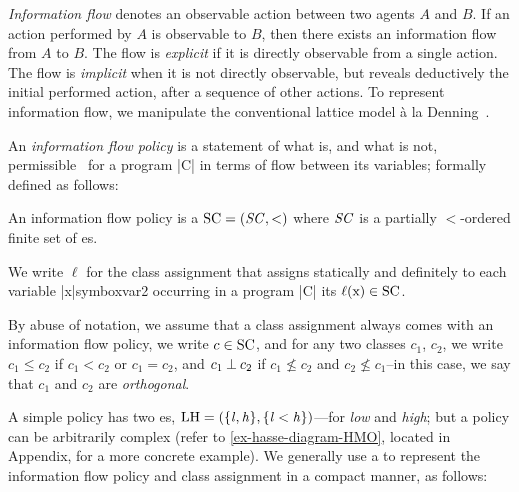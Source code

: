 \emph{Information flow} denotes an observable action
between two agents \(A\) and \(B\). If an action performed by \(A\) is
observable to \(B\), then there exists an information flow from \(A\) to \(B\).
The flow is \emph{explicit} if it is directly
observable from a single action. The flow is \emph{implicit} when it is not directly observable, but reveals deductively the
initial performed action, after a sequence of other actions. To represent
information flow, we manipulate the conventional lattice model à
la Denning~\cite{denning76}.

An \emph{information flow policy} is a statement
of what is, and what is not, permissible~\cite{bishop2003} for a program
\prc|C| in terms of flow between its variables; formally defined as
follows:

\begin{definition}\label{def:ifp} An information flow policy is a  \(\mathrm{SC} = (\mathit{SC}, <)\) where
\(\mathit{SC}\) is a partially \(<\)-ordered finite set of
es.

We write \(\ell\) for the class assignment that assigns
statically and definitely to each variable \prc|x|symbo{xvar2} occurring in a
program \prc|C| its  \(\lvl{\prc|x|} \in
\SC\). \end{definition}

By abuse of notation, we assume that a class assignment always comes with an
information flow policy, we write \(c \in
\mathrm{SC}\), and for any two classes
\(c_1\), \(c_2\), we write \(c_1 \leqslant c_2\) if \(c_1 < c_2\) or \(c_1 =
c_2\), and \(c_1 \mathbin{\bot} c_2\) if  \(c_1 \nleqslant c_2\) and \(c_2 \nleqslant
c_1\)--in this case, we say that \(c_1\) and \(c_2\) are \emph{orthogonal}.

A simple policy has two es,
\eg \(\mathrm{LH}=(\{\mathit{l}, \mathit{h}\}, \{\mathit{l} < \mathit{h}\})\)---for \emph{low} and
\emph{high}; but a policy can be arbitrarily complex (refer to
\autoref{ex-hasse-diagram-HMO}, located in Appendix, for a more concrete
example). We generally use a  to represent the information
flow policy and class assignment in a compact
manner, as follows:

